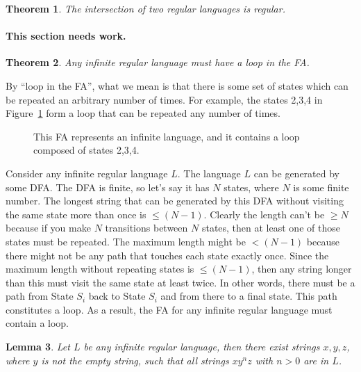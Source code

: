 \documentclass[letterpaper,12pt,openany,reqno]{book}%
\newcommand{\needswork}{\paragraph{This section needs work.}}
\newcommand{\fanonterminalnode}[2] {\node at (#1) (#2) [circle, draw, minimum size=24pt] {#2};}
\newcommand{\fatransition}[3] {\draw [-{Latex[length=3mm,width=2.5mm]}] (#1) -- (#2) node [midway, above] {#3};}
\newcommand{\faarctransition}[5] {\draw [-{Latex[length=3mm,width=2.5mm]}] (#1) to[out=#4, in=#5] node  [midway, above] {#3} (#2) ;}
\newtheorem{theorem}{Theorem}
\newtheorem{lemma}[theorem]{Lemma}
\begin{document}
\begin{theorem}
The intersection of two regular languages is regular.
\end{theorem}
\needswork

\begin{theorem}
Any infinite regular language must have a loop in the FA.
\end{theorem}
By ``loop in the FA'', what we mean is that there is some set of states which can be repeated an arbitrary number of times. For example, the states 2,3,4 in Figure~\ref{F.FA.loop} form a loop that can be repeated any number of times. 
\begin{figure}[hbt]
\centering
{}
\caption[FA with a loop]{This FA represents an infinite language, and it contains a loop composed of states 2,3,4.}
\label{F.FA.loop}
\end{figure}
Consider any infinite regular language $L$. The language $L$ can be generated by some DFA. The DFA is finite, so let's say it has $N$ states, where $N$ is some finite number. The longest string that can be generated by this DFA without visiting the same state more than once is $\le (N-1)$. Clearly the length can't be $\ge N$ because if you make $N$ transitions between $N$ states, then at least one of those states must be repeated. The maximum length might be $< (N-1)$ because there might not be any path that touches each state exactly once. Since the maximum length without repeating states is $\le (N-1)$, then any string longer than this must visit the same state at least twice. In other words, there must be a path from State $S_i$ back to State $S_i$ and from there to a final state. This path constitutes a loop. As a result, the FA for any infinite regular language must contain a loop.

\begin{lemma}
\label{T.RL.pumping.lemma}
Let $L$ be any infinite regular language, then there exist strings $x,y,z$, where $y$ is not the empty string, such that all strings $x y^n z$ with $n>0$ are in $L$.
\end{lemma}
\end{document}
